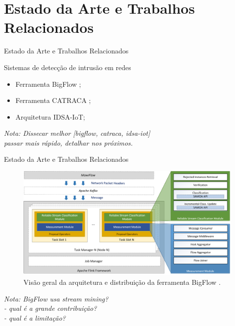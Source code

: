 \documentclass[aspectratio=43,10pt]{beamer}
\newcommand{\nota}[1]{\hspace*{-0.5cm}\textit{{\color[rgb]{1,0,0}Nota: #1}}}
\begin{document}
\section{Estado da Arte e Trabalhos Relacionados}

\newcommand{\idsiot}{IDSA-IoT\xspace}

\begin{frame}[fragile]{Estado da Arte e Trabalhos Relacionados}
\begin{alertblock}{Sistemas de detecção de intrusão em redes}
  \begin{itemize}
    \item Ferramenta BigFlow \cite{Viegas2019};
    \item Ferramenta CATRACA \cite{Lopez2018};
    \item Arquitetura \idsiot \cite{Cassales2019a};
  \end{itemize}
\end{alertblock}
\nota{%
Dissecar melhor [bigflow, catraca, idsa-iot]\\
passar mais rápido, detalhar nos próximos.}
\end{frame}

\begin{frame}[fragile]{Estado da Arte e Trabalhos Relacionados}
\begin{figure}[ht]
  \centering
  \includegraphics[width=\textwidth]{figuras/bigflow-fig5-bigflow_arch.png}
  \caption{Visão geral da arquitetura e distribuição da ferramenta BigFlow \cite{Viegas2019}.}
  \label{fig:bigflow-arch}
\end{figure}
\nota{BigFlow usa stream mining?\\
- qual é a grande contribuição?\\
- qual é a limitação?}
\end{frame}
\end{document}
